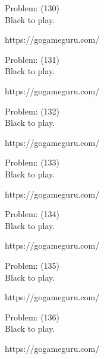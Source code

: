 \documentclass[11pt]{article}
\begin{document}
\begin{minipage}[t]{0.5\textwidth}
  {\centering
  
  Problem: (130)\\
  Black to play.

https://gogameguru.com/\\
  }
\end{minipage}
\begin{minipage}[t]{0.5\textwidth}
  {\centering
  
  Problem: (131)\\
  Black to play.

https://gogameguru.com/\\
  }
\end{minipage}
\begin{minipage}[t]{0.5\textwidth}
  {\centering
  
  Problem: (132)\\
  Black to play.

https://gogameguru.com/\\
  }
\end{minipage}
\begin{minipage}[t]{0.5\textwidth}
  {\centering
  
  Problem: (133)\\
  Black to play.

https://gogameguru.com/\\
  }
\end{minipage}
\begin{minipage}[t]{0.5\textwidth}
  {\centering
  
  Problem: (134)\\
  Black to play.

https://gogameguru.com/\\
  }
\end{minipage}
\begin{minipage}[t]{0.5\textwidth}
  {\centering
  
  Problem: (135)\\
  Black to play.

https://gogameguru.com/\\
  }
\end{minipage}
\begin{minipage}[t]{0.5\textwidth}
  {\centering
  
  Problem: (136)\\
  Black to play.

https://gogameguru.com/\\
  }
\end{minipage}
\end{document}
